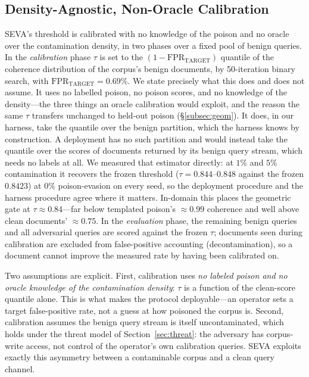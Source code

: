 \documentclass[10pt,journal,compsoc]{IEEEtran}
\begin{document}
\subsection{Density-Agnostic, Non-Oracle Calibration}
SEVA's threshold is calibrated with no knowledge of the poison and no oracle over the
contamination density, in two phases over a fixed pool of benign queries. In the
\emph{calibration} phase $\tau$ is set to the $(1-\mathrm{FPR}_{\mathrm{TARGET}})$ quantile of
the coherence distribution of the corpus's benign documents, by 50-iteration binary search, with
$\mathrm{FPR}_{\mathrm{TARGET}}=0.69\%$. We state precisely what this does and does not assume.
It uses no labelled poison, no poison scores, and no knowledge of the density---the three things
an oracle calibration would exploit, and the reason the same $\tau$ transfers unchanged to
held-out poison (\S\ref{subsec:geom}). It does, in our harness, take the quantile over the
benign partition, which the harness knows by construction. A deployment has no such partition
and would instead take the quantile over the scores of documents returned by its benign query
stream, which needs no labels at all. We measured that estimator directly: at $1\%$ and $5\%$
contamination it recovers the frozen threshold ($\tau=0.844$--$0.848$ against the frozen
$0.8423$) at $0\%$ poison-evasion on every seed, so the deployment procedure and the harness
procedure agree where it matters. In-domain this places the geometric gate at
$\tau\approx0.84$---far below templated poison's $\approx\!0.99$ coherence and well
above clean documents' $\approx\!0.75$. In the \emph{evaluation} phase, the
remaining benign queries and all adversarial queries are scored against the frozen
$\tau$; documents seen during calibration are excluded from false-positive
accounting (decontamination), so a document cannot improve the measured rate by
having been calibrated on.

Two assumptions are explicit. First, calibration uses \emph{no labeled poison and
no oracle knowledge of the contamination density}: $\tau$ is a function of the
clean-score quantile alone. This is what makes the protocol deployable---an operator
sets a target false-positive rate, not a guess at how poisoned the corpus is.
Second, calibration assumes the benign query stream is itself uncontaminated, which
holds under the threat model of Section~\ref{sec:threat}: the adversary has
corpus-write access, not control of the operator's own calibration queries. SEVA
exploits exactly this asymmetry between a contaminable corpus and a clean query
channel.
\end{document}

